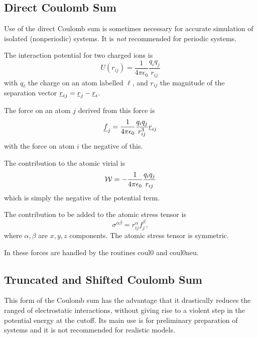 \subsection{Direct Coulomb Sum}

Use of the direct Coulomb sum is sometimes necessary for accurate
simulation of isolated (nonperiodic) systems. It is {\em not}
recommended for periodic systems.

The interaction potential for two charged ions is
\begin{equation}
U(r_{ij})=\frac{1}{4\pi\epsilon_{0}}\frac{q_{i}q_{j}}{r_{ij}}
\end{equation}
with $q_{\ell}$ the charge on an atom labelled $\ell$, and $r_{ij}$
the magnitude of the separation vector
$\mbox{$\underline{r}$}_{ij}=\mbox{$\underline{r}$}_{j}-\mbox{$\underline{r}$}_{i}$.

The force on an atom $j$ derived from this force is
\begin{equation}
\mbox{$\underline{f}$}_{j}=\frac{1}{4\pi\epsilon_{0}}\frac{q_{i}q_{j}}{r_{ij}^{3}}\mbox{$\underline{r}$}_{ij}
\end{equation}
with the force on atom $i$ the negative of this.

The contribution to the atomic virial is
\begin{equation}
{\cal W}=-\frac{1}{4\pi\epsilon_{0}}\frac{q_{i}q_{j}}{r_{ij}}
\end{equation}
which is simply the negative of the potential term.

The contribution to be added to the atomic stress tensor is
\begin{equation}
\sigma^{\alpha \beta}=r_{ij}^{\alpha}f_{j}^{\beta},
\end{equation}
where $\alpha,\beta$ are $x,y,z$ components. The atomic stress tensor
is symmetric.

In \D{} these forces are handled by the routines {\sc coul0}
and {\sc coul0neu}.

\subsection{Truncated and Shifted Coulomb Sum}

This form of the Coulomb sum has the advantage that it drastically
reduces the ranged of electrostatic interactions, without giving rise
to a violent step in the potential energy at the cutoff. Its main use
is for preliminary preparation of systems and it is not recommended
for realistic models.

